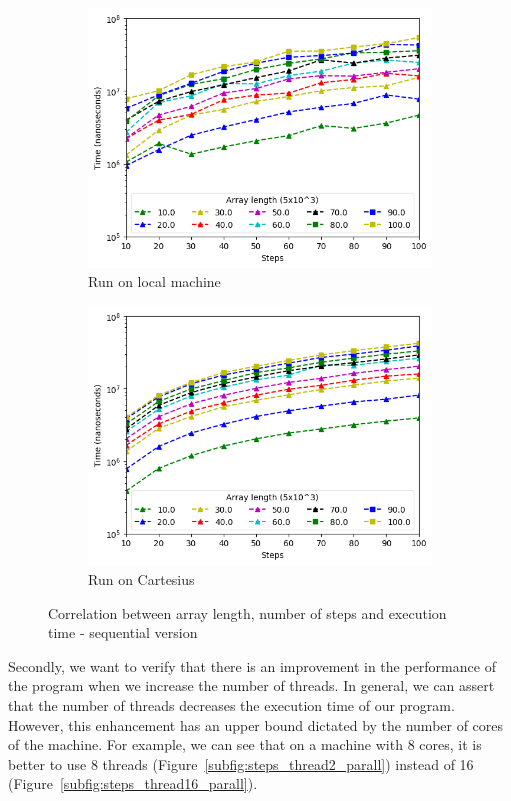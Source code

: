 \documentclass[a4paper]{article}
\begin{document}
\begin{figure}[htbp]
\begin{subfigure}{.45\textwidth}
  \includegraphics[width=\linewidth]{res/seq/array_steps_res_seq.png}
  \caption{Run on local machine}
  \label{subfig:steps_seq}
\end{subfigure}%
\begin{subfigure}{.45\textwidth}
  \centering
  \includegraphics[width=\linewidth]{res/seq/array_steps_res_seq_cartesius.png}
  \caption{Run on Cartesius}
  \label{subfig:steps_seq_cart}
\end{subfigure}
\caption{Correlation between array length, number of steps and execution time - sequential version}
\label{fig:seq}
\end{figure}

Secondly, we want to verify that there is an improvement in the performance of the program when we increase the number of threads. In general, we can assert that the number of threads decreases the execution time of our program. However, this enhancement has an upper bound dictated by the number of cores of the machine. For example, we can see that on a machine with 8 cores, it is better to use 8 threads (Figure~\ref{subfig:steps_thread2_parall}) instead of 16 (Figure~\ref{subfig:steps_thread16_parall}).
\end{document}
